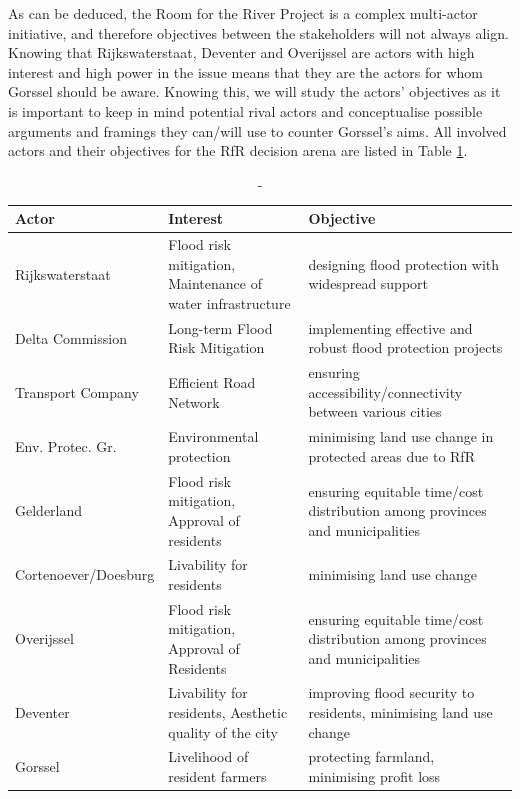 \noindent As can be deduced, the Room for the River Project is a complex multi-actor initiative, and therefore objectives between the stakeholders will not always align. Knowing that Rijkswaterstaat, Deventer and Overijssel are actors with high interest and high power in the issue means that they are the actors for whom Gorssel should be aware. Knowing this, we will study the actors' objectives as it is important to keep in mind potential rival actors and conceptualise possible arguments and framings they can/will use to counter Gorssel's aims. All involved actors and their objectives for the RfR decision arena are listed in Table \ref{t:actortable}.

\begin{table}[h!]
\caption{-}
\begin{tabular}{p{}p{}p{}}
\hline 
Actor & Interest & Objective \\ \hline
Rijkswaterstaat         & Flood risk mitigation, Maintenance of water infrastructure & designing flood protection with widespread support \\ 
Delta Commission        & Long-term Flood Risk Mitigation & implementing effective and robust flood protection projects \\
Transport Company       & Efficient Road Network & ensuring accessibility/connectivity between various cities \\
Env. Protec. Gr.        & Environmental protection & minimising land use change in protected areas due to RfR \\
Gelderland              & Flood risk mitigation, Approval of residents & ensuring equitable time/cost distribution among provinces and municipalities \\
Cortenoever/Doesburg    & Livability for residents & minimising land use change \\
Overijssel              & Flood risk mitigation, Approval of Residents & ensuring equitable time/cost distribution among provinces and municipalities \\
Deventer                & Livability for residents, Aesthetic quality of the city & improving flood security to residents, minimising land use change \\
Gorssel                & Livelihood of resident farmers & protecting farmland, minimising profit loss \\
\end{tabular}
\label{t:actortable}
\end{table}

